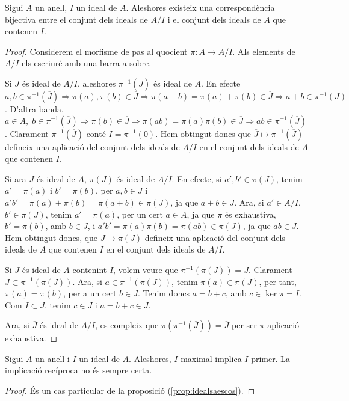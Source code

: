 \documentclass[../main.tex]{subfiles}
\begin{document}
\begin{lema}\label{lema:correspondenciabijectivaideals}\label{esal21}
Sigui $A$ un anell, $I$ un ideal de $A$. Aleshores existeix una correspondència bijectiva entre el conjunt dels ideals de $A/I$ i el conjunt dels ideals de $A$ que contenen $I$.
\end{lema}
\begin{proof}
Considerem el morfisme de pas al quocient $\pi:A\rightarrow A/I$. Als elements de $A/I$ els escriuré amb una barra a sobre.
    
    Si $\overline{J}$ és ideal de $A/I$, aleshores $\pi^{-1}(\overline{J})$ és ideal de $A$. En efecte $a,b\in \pi^{-1}(\overline{J})\Rightarrow\pi(a),\pi(b)\in\overline{J}\Rightarrow \pi(a+b) = \pi(a)+\pi(b)\in \overline{J}\Rightarrow a+b\in \pi^{-1}(J)$. D'altra banda, 
    $a\in A,\;b\in\pi^{-1}(\overline{J})\Rightarrow\pi(b)\in \overline{J}\Rightarrow \pi(ab) = \pi(a)\pi(b)\in\overline{J}\Rightarrow ab\in \pi^{-1}(\overline{J})$. Clarament $\pi^{-1}(\overline{J})$ conté $I = \pi^{-1}(0)$. Hem obtingut doncs que $\overline{J}\mapsto \pi^{-1}(\overline{J})$ defineix una aplicació del conjunt dels ideals de $A/I$ en el conjunt dels ideals de $A$ que contenen $I$.
    
    Si ara $J$ és ideal de $A$, $\pi(J)$ és ideal de $A/I$. En efecte, si $a',b'\in\pi(J)$, tenim $a' = \pi(a)$ i $b' = \pi(b)$, per $a,b\in J$ i $a'b' = \pi(a)+\pi(b) = \pi(a+b)\in \pi(J)$, ja que $a+b\in J$. Ara, si $a'\in A/I$, $b'\in\pi(J)$, tenim $a'=\pi(a)$, per un cert $a\in A$, ja que $\pi$ és exhaustiva, $b'=\pi(b)$, amb $b\in J$, i $a'b'=\pi(a)\pi(b) = \pi(ab)\in \pi(J)$, ja que $ab\in J$. Hem obtingut doncs, que $J\mapsto\pi(J)$ defineix una aplicació del conjunt dels ideals de $A$ que contenen $I$ en el conjunt dels ideals de $A/I$.
    
    Si $J$ és ideal de $A$ contenint $I$, volem veure que $\pi^{-1}(\pi(J)) = J$. Clarament $J\subset\pi^{-1}(\pi(J))$. Ara, si $a\in\pi^{-1}(\pi(J))$, tenim $\pi(a)\in\pi(J)$, per tant, $\pi(a)=\pi(b)$, per a un cert $b\in J$. Tenim doncs $a = b+c$, amb $c\in\ker\pi = I$. Com $I\subset J$, tenim $c\in J$ i $a = b+c\in J$.
    
    Ara, si $\overline{J}$ és ideal de $A/I$, es compleix que $\pi(\pi^{-1}(\overline{J})) = \overline{J}$ per ser $\pi$ aplicació exhaustiva.
\end{proof}

\begin{nota}\label{nota:maximalimplicaprimer}
    Sigui $A$ un anell i $I$ un ideal de $A$. Aleshores, $I$ maximal implica $I$ primer. La implicació recíproca no és sempre certa.
\end{nota}
\begin{proof}
És un cas particular de la proposició (\ref{prop:idealsaescos}).
\end{proof}
\end{document}
